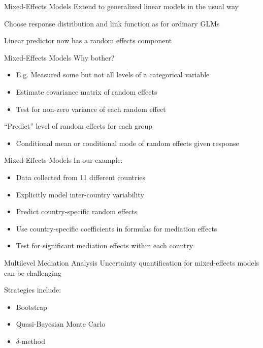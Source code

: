 \documentclass[14pt]{beamer}
\newcommand{\GLMMs}{Mixed-Effects Models}
\begin{document}
\begin{frame}{\GLMMs}
    Extend to generalized linear models in the usual way \newline

    Choose response distribution and link function as for ordinary GLMs \newline

    Linear predictor now has a random effects component \newline
\end{frame}

\begin{frame}{\GLMMs}
    Why bother?
    \begin{itemize}
        \item E.g. Measured some but not all levels of a categorical variable
        \item Estimate covariance matrix of random effects
        \item Test for non-zero variance of each random effect \newline
    \end{itemize}

    ``Predict'' level of random effects for each group
    \begin{itemize}
        \item Conditional mean or conditional mode of random effects given response
    \end{itemize}
\end{frame}

\begin{frame}{\GLMMs}
    In our example:
    \begin{itemize}
        \item Data collected from 11 different countries
        \item Explicitly model inter-country variability
        \item Predict country-specific random effects
        \item Use country-specific coefficients in formulas for mediation effects
        \item Test for significant mediation effects within each country \newline
    \end{itemize}
\end{frame}

\begin{frame}{Multilevel Mediation Analysis}
    Uncertainty quantification for mixed-effects models can be challenging  \newline
    
    Strategies include:
    \begin{itemize}
        \item Bootstrap
        \item Quasi-Bayesian Monte Carlo
        \item $\delta$-method
    \end{itemize}
\end{frame}
\end{document}
